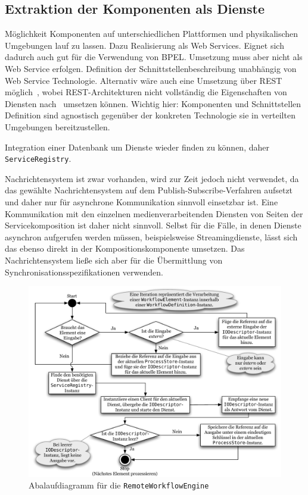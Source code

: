 \subsection{Extraktion der Komponenten als Dienste} %
\label{sub:extraktion_der_komponenten_als_dienste}

  Möglichkeit Komponenten auf unterschiedlichen Plattformen und physikalischen Umgebungen lauf zu lassen. Dazu Realisierung als Web Services. Eignet sich dadurch auch gut für die Verwendung von BPEL. Umsetzung muss aber nicht als Web Service erfolgen. Definition der Schnittstellenbeschreibung unabhängig von Web Service Technologie. Alternativ wäre auch eine Umsetzung über REST möglich~\citep{fielding00rest}, wobei REST-Architekturen nicht vollständig die  Eigenschaften von Diensten nach~\citep{service_oriented_computing} umsetzen können. Wichtig hier: Komponenten und Schnittstellen Definition sind agnostisch gegenüber der konkreten Technologie sie in verteilten Umgebungen bereitzustellen.
  
  Integration einer Datenbank um Dienste wieder finden zu können, daher \verb!ServiceRegistry!.
  
  Nachrichtensystem ist zwar vorhanden, wird zur Zeit jedoch nicht verwendet, da das gewählte Nachrichtensystem auf dem Publish-Subscribe-Verfahren aufsetzt und daher nur für asynchrone Kommunikation sinnvoll einsetzbar ist. Eine Kommunikation mit den einzelnen medienverarbeitenden Diensten von Seiten der Servicekomposition ist daher nicht sinnvoll. Selbst für die Fälle, in denen Dienste asynchron aufgerufen werden müssen, beispielsweise Streamingdienste, lässt sich das ebenso direkt in der Kompositionskomponente umsetzen. Das Nachrichtensystem ließe sich aber für die Übermittlung von Synchronisationsspezifikationen verwenden.
  
\begin{figure}[ht]
  \centering
    \includegraphics[width=.7\textwidth]{images/WorkflowEngine_Flowchart.pdf}
  \caption{Abalaufdiagramm für die \texttt{RemoteWorkflowEngine}}
  \label{fig:images_WorkflowEngine_Flowchart}
\end{figure}

